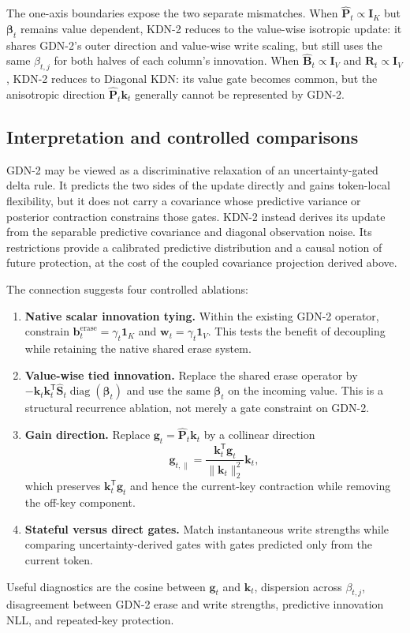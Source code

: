 \documentclass[11pt]{article}
\newcommand{\ve}[1]{\boldsymbol{#1}}
\newcommand{\tr}{\mathsf{T}}
\newcommand{\diag}{\operatorname{diag}}
\begin{document}
The one-axis boundaries expose the two separate mismatches.  When
$\widehat{\ve{P}}_t\propto\ve{I}_K$ but $\ve{\beta}_t$ remains value dependent, KDN-2 reduces to
the value-wise isotropic update: it shares GDN-2's outer direction and value-wise write scaling,
but still uses the same $\beta_{t,j}$ for both halves of each column's innovation.  When
$\widehat{\ve{B}}_t\propto\ve{I}_V$ and $\ve{R}_t\propto\ve{I}_V$, KDN-2 reduces to Diagonal KDN:
its value gate becomes common, but the anisotropic direction
$\widehat{\ve{P}}_t\ve{k}_t$ generally cannot be represented by GDN-2.

\subsection{Interpretation and controlled comparisons}

GDN-2 may be viewed as a discriminative relaxation of an uncertainty-gated delta rule.  It
predicts the two sides of the update directly and gains token-local flexibility, but it does not
carry a covariance whose predictive variance or posterior contraction constrains those gates.
KDN-2 instead derives its update from the separable predictive covariance and diagonal observation
noise.  Its restrictions provide a calibrated predictive distribution and a causal notion of
future protection, at the cost of the coupled covariance projection derived above.

The connection suggests four controlled ablations:
\begin{enumerate}
  \item \textbf{Native scalar innovation tying.}  Within the existing GDN-2 operator, constrain
    $\ve{b}_t^{\mathrm{erase}}=\gamma_t\ve{1}_K$ and
    $\ve{w}_t=\gamma_t\ve{1}_V$.  This tests the benefit of decoupling while retaining the native
    shared erase system.
  \item \textbf{Value-wise tied innovation.}  Replace the shared erase operator by
    $-\ve{k}_t\ve{k}_t^{\tr}\widehat{\ve{S}}_t\diag(\ve{\beta}_t)$ and use the same
    $\ve{\beta}_t$ on the incoming value.  This is a structural recurrence ablation, not merely a
    gate constraint on GDN-2.
  \item \textbf{Gain direction.}  Replace $\ve{g}_t=\widehat{\ve{P}}_t\ve{k}_t$ by a collinear
    direction
    \begin{equation*}
      \ve{g}_{t,\parallel}
      =\frac{\ve{k}_t^{\tr}\ve{g}_t}{\|\ve{k}_t\|_2^2}\ve{k}_t,
    \end{equation*}
    which preserves $\ve{k}_t^{\tr}\ve{g}_t$ and hence the current-key contraction while
    removing the off-key component.
  \item \textbf{Stateful versus direct gates.}  Match instantaneous write strengths while
    comparing uncertainty-derived gates with gates predicted only from the current token.
\end{enumerate}
Useful diagnostics are the cosine between $\ve{g}_t$ and $\ve{k}_t$, dispersion across
$\beta_{t,j}$, disagreement between GDN-2 erase and write strengths, predictive innovation NLL,
and repeated-key protection.
\end{document}
